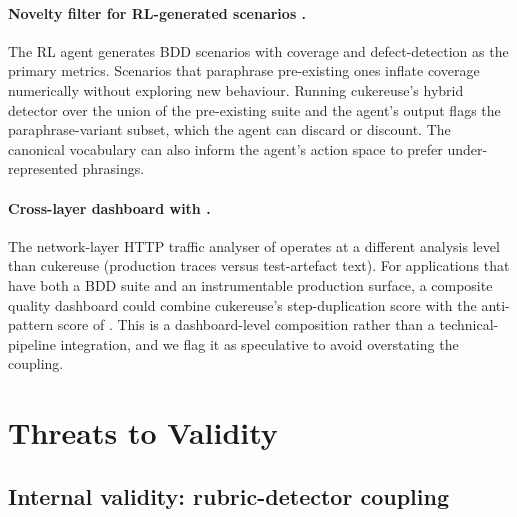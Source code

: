 \documentclass[11pt,a4paper]{article}
\begin{document}
\paragraph{Novelty filter for RL-generated scenarios
\citep{mughal2025rlagent}.} The RL agent generates BDD scenarios with
coverage and defect-detection as the primary metrics. Scenarios
that paraphrase pre-existing ones inflate coverage numerically
without exploring new behaviour. Running cukereuse's hybrid
detector over the union of the pre-existing suite and the agent's
output flags the paraphrase-variant subset, which the agent can
discard or discount. The canonical vocabulary can also inform the
agent's action space to prefer under-represented phrasings.

\paragraph{Cross-layer dashboard with \citep{mughal2026networklayer}.}
The network-layer HTTP traffic analyser of
\citet{mughal2026networklayer} operates at a different analysis
level than cukereuse (production traces versus test-artefact text).
For applications that have both a BDD suite and an instrumentable
production surface, a composite quality dashboard could combine
cukereuse's step-duplication score with the anti-pattern score of
\citet{mughal2026networklayer}. This is a dashboard-level
composition rather than a technical-pipeline integration, and we
flag it as speculative to avoid overstating the coupling.

\section{Threats to Validity}
\label{sec:threats}

\subsection{Internal validity: rubric-detector coupling}
\end{document}
